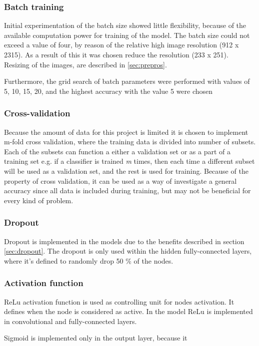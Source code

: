 \subsubsection{Batch training}
Initial experimentation of the batch size showed little flexibility, because of the available computation power for training of the model. The batch size could not exceed a value of four, by reason of the relative high image resolution (912 x 2315). As a result of this it was chosen reduce the resolution (233 x 251). Resizing of the images, are described in \ref{sec:prepros}.

Furthermore, the grid search of batch parameters were performed with values of 5, 10, 15, 20, and the highest accuracy with the value 5 were chosen

\subsubsection{Cross-validation}
Because the amount of data for this project is limited it is chosen to implement m-fold cross validation, where the training data is divided into  number of subsets. Each of the subsets can function a either a validation set or as a part of a training set e.g. if a classifier is trained \textit{m} times, then each time a different subset will be used as a validation set, and the rest is used for training. \citep{Duda2000}
Because of the property of cross validation, it can be used as a way of investigate a general accuracy since all data is included during training, but may not be beneficial for every kind of problem. \citep{Duda2000}

\subsubsection{Dropout}
Dropout is implemented in the models due to the benefits described in section \ref{sec:dropout}. The dropout is only used within the hidden fully-connected layers, where it’s defined to randomly drop 50 \% of the nodes.

\subsubsection{Activation function}
ReLu activation function is used as controlling unit for nodes activation. It defines when the node is considered as active. In the model ReLu is  implemented in convolutional and fully-connected layers.

Sigmoid is implemented only in the output layer, because it 

